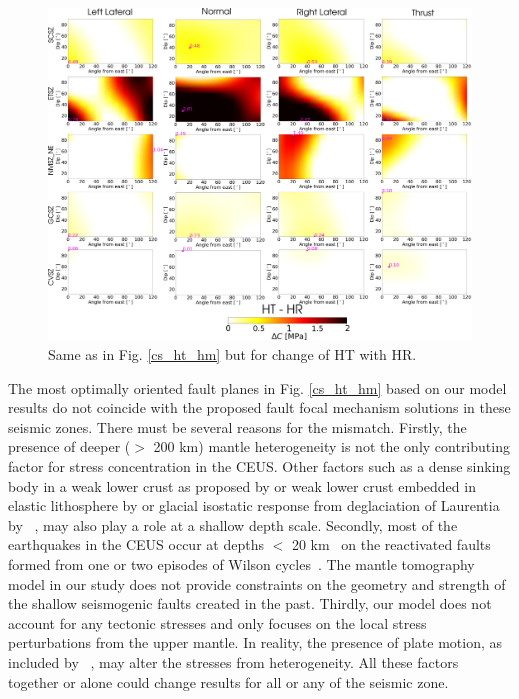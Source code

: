 \documentclass[draft,linenumbers]{agujournal2018}
\begin{document}
%
\begin{figure}[ht]
    \centering
    \includegraphics[width=\linewidth]{figures/ht_hr_summ.png}
    \caption{Same as in Fig. \ref{cs_ht_hm} but for change of HT with HR.}
    \label{cs_ht_hr}
\end{figure}

     The most optimally oriented fault planes in Fig. \ref{cs_ht_hm} based on our model results do not coincide with the proposed fault focal mechanism solutions in these seismic zones. There must be several reasons for the mismatch. Firstly, the presence of deeper ($>$ 200 km) mantle heterogeneity is not the only contributing factor for stress concentration in the CEUS. Other factors such as a dense sinking body in a weak lower crust as proposed by \citet{Pollitz_2001} or weak lower crust embedded in elastic lithosphere by \citet{Kenner_2000a} or glacial isostatic response from deglaciation of Laurentia by ~\citet{Grollimund_2001}, may also play a role at a shallow depth scale.  Secondly, most of the earthquakes in the CEUS occur at depths $<$ 20 km~\citep[e.g.,][]{bollinger1985seismicity, chiu1992imaging, powell2016grenville} on the reactivated faults formed from one or two episodes of Wilson cycles~\citep{thomas2006tectonic, wolin2012mineral}. The mantle tomography model in our study does not provide constraints on the geometry and strength of the shallow seismogenic faults created in the past. Thirdly, our model does not account for any tectonic stresses and only focuses on the local stress perturbations from the upper mantle. In reality, the presence of plate motion, as included by~\citet{zhan2016stress} \citet{levandowski2016dense}, may alter the stresses from heterogeneity. All these factors together or alone could change results for all or any of the seismic zone.
    
\end{document}
